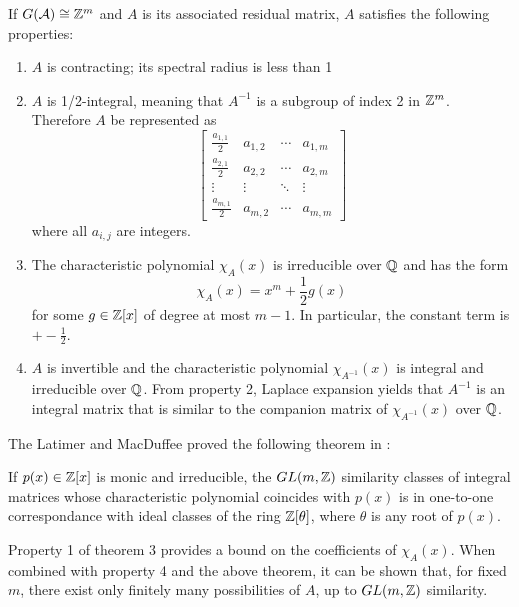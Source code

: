 \documentclass[11pt, titlepage]{article}
\begin{document}
\begin{theorem}
If $G(\mathcal{A}) \cong \mathbb{Z}^m$ and $A$ is its associated
residual matrix, $A$ satisfies the following properties:
\begin{enumerate}
\item $A$ is contracting; its spectral radius is less than 1
\item $A$ is 1/2-integral, meaning that $A^{-1}$ is a subgroup of
  index 2 in $\mathbb{Z}^m$. Therefore $A$ be represented as
  \[
    \begin{bmatrix}
      \frac{a_{1,1}}{2} & a_{1,2} & \cdots & a_{1,m} \\
      \frac{a_{2,1}}{2} & a_{2,2} & \cdots & a_{2,m} \\
      \vdots & \vdots & \ddots & \vdots \\
      \frac{a_{m,1}}{2} & a_{m,2} & \cdots & a_{m,m}
    \end{bmatrix}
  \]
  where all
  $a_{i,j}$ are integers.
\item The characteristic polynomial $\chi_A(x)$ is irreducible over
  $\mathbb{Q}$ and has the form
  \[ \chi_A(x) = x^m + \frac{1}{2}g(x) \] for some $g \in \mathbb{Z}[x]$ of
  degree at most $m-1$. In particular, the constant term is
  $+-\frac{1}{2}$.
\item $A$ is invertible and the characteristic polynomial
  $\chi_{A^{-1}}(x)$ is integral and irreducible over $\mathbb{Q}$. From
  property 2, Laplace expansion yields that $A^{-1}$ is an integral
  matrix that is similar to the companion matrix of $\chi_{A^{-1}}(x)$
  over $\mathbb{Q}$.
\end{enumerate}
\end{theorem}

The Latimer and MacDuffee proved the following theorem in
\cite{latimer:corresp}:

\begin{theorem}
  If $p(x) \in \mathbb{Z}[x]$ is monic and irreducible, the $GL(m, \mathbb{Z})$
  similarity classes of integral matrices whose characteristic
  polynomial coincides with $p(x)$ is in one-to-one correspondance
  with ideal classes of the ring $\mathbb{Z}[\theta]$, where $\theta$ is any
  root of $p(x)$.
\end{theorem}

Property 1 of theorem 3 provides a bound on the coefficients of
$\chi_A(x)$. When combined with property 4 and the above theorem, it
can be shown that, for fixed $m$, there exist only finitely many
possibilities of $A$, up to $GL(m, \mathbb{Z})$ similarity.
\end{document}
